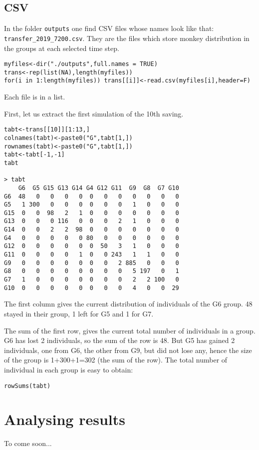 \subsection{CSV}

In the folder \texttt{outputs} one find CSV files whose names look like that: \texttt{transfer\_2019\_7200.csv}. They are the files which store monkey distribution in the groups at each selected time step.

\begin{lstlisting}
myfiles<-dir("./outputs",full.names = TRUE)
trans<-rep(list(NA),length(myfiles))
for(i in 1:length(myfiles)) trans[[i]]<-read.csv(myfiles[i],header=F)
\end{lstlisting}

Each file is in a list.

First, let us extract the first simulation of the 10th saving.

\begin{lstlisting}
tabt<-trans[[10]][1:13,]
colnames(tabt)<-paste0("G",tabt[1,])
rownames(tabt)<-paste0("G",tabt[1,])
tabt<-tabt[-1,-1]
tabt

> tabt
    G6  G5 G15 G13 G14 G4 G12 G11  G9  G8  G7 G10
G6  48   0   0   0   0  0   0   0   0   0   0   0
G5   1 300   0   0   0  0   0   0   1   0   0   0
G15  0   0  98   2   1  0   0   0   0   0   0   0
G13  0   0   0 116   0  0   0   2   1   0   0   0
G14  0   0   2   2  98  0   0   0   0   0   0   0
G4   0   0   0   0   0 80   0   0   0   0   0   0
G12  0   0   0   0   0  0  50   3   1   0   0   0
G11  0   0   0   0   1  0   0 243   1   1   0   0
G9   0   0   0   0   0  0   0   2 885   0   0   0
G8   0   0   0   0   0  0   0   0   5 197   0   1
G7   1   0   0   0   0  0   0   0   2   2 100   0
G10  0   0   0   0   0  0   0   0   4   0   0  29
\end{lstlisting}

The first column gives the current distribution of individuals of the G6 group. 48 stayed in their group, 1 left for G5 and 1 for G7. 

The sum of the first row, gives the current total number of individuals in a group. G6 has lost 2 individuals, so the sum of the row is 48. But G5 has gained 2 individuals, one from G6, the other from G9, but did not lose any, hence the size of the group is 1+300+1=302 (the sum of the row). The total number of individual in each group is easy to obtain:

\begin{lstlisting}
rowSums(tabt)
\end{lstlisting}
 

\section{Analysing results}




To come soon...